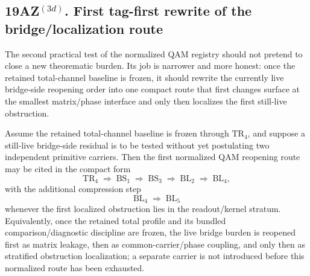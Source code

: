 \subsection*{19AZ$^{(3d)}$. First tag-first rewrite of the bridge/localization route}
\label{sec:first-tag-first-bridge-localization-route}
The second practical test of the normalized QAM registry should not pretend to close a new theorematic burden. Its job is narrower and more honest: once the retained total-channel baseline is frozen, it should rewrite the currently live bridge-side reopening order into one compact route that first changes surface at the smallest matrix/phase interface and only then localizes the first still-live obstruction.

\begin{proposition}
\label{prop:first-tag-first-bridge-localization-route}
Assume the retained total-channel baseline is frozen through \(\mathrm{TR}_4\), and suppose a still-live bridge-side residual is to be tested without yet postulating two independent primitive carriers. Then the first normalized QAM reopening route may be cited in the compact form
\[
  \mathrm{TR}_4 \;\Longrightarrow\; \mathrm{BS}_1 \;\Longrightarrow\; \mathrm{BS}_3 \;\Longrightarrow\; \mathrm{BL}_2 \;\Longrightarrow\; \mathrm{BL}_4,
\]
with the additional compression step
\[
  \mathrm{BL}_4 \;\Longrightarrow\; \mathrm{BL}_5
\]
whenever the first localized obstruction lies in the readout/kernel stratum.
Equivalently, once the retained total profile and its bundled comparison/diagnostic discipline are frozen, the live bridge burden is reopened first as matrix leakage, then as common-carrier/phase coupling, and only then as stratified obstruction localization; a separate carrier is not introduced before this normalized route has been exhausted.
\end{proposition}

